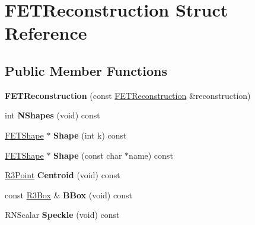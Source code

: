 \hypertarget{struct_f_e_t_reconstruction}{}\section{F\+E\+T\+Reconstruction Struct Reference}
\label{struct_f_e_t_reconstruction}
\subsection*{Public Member Functions}
\begin{DoxyCompactItemize}
\item 
{\bfseries F\+E\+T\+Reconstruction} (const \hyperlink{struct_f_e_t_reconstruction}{F\+E\+T\+Reconstruction} \&reconstruction)\hypertarget{struct_f_e_t_reconstruction_a7a38b2b91e590ef69766b621ffb56ffe}{}\label{struct_f_e_t_reconstruction_a7a38b2b91e590ef69766b621ffb56ffe}

\item 
int {\bfseries N\+Shapes} (void) const \hypertarget{struct_f_e_t_reconstruction_aa6a4ec3001aaee64cb7f915b79f75ab9}{}\label{struct_f_e_t_reconstruction_aa6a4ec3001aaee64cb7f915b79f75ab9}

\item 
\hyperlink{struct_f_e_t_shape}{F\+E\+T\+Shape} $\ast$ {\bfseries Shape} (int k) const \hypertarget{struct_f_e_t_reconstruction_a5623ece2b769927c2d5f8a7478a34ea3}{}\label{struct_f_e_t_reconstruction_a5623ece2b769927c2d5f8a7478a34ea3}

\item 
\hyperlink{struct_f_e_t_shape}{F\+E\+T\+Shape} $\ast$ {\bfseries Shape} (const char $\ast$name) const \hypertarget{struct_f_e_t_reconstruction_a55c0ae1d8f702f754be5d3a5e32632b3}{}\label{struct_f_e_t_reconstruction_a55c0ae1d8f702f754be5d3a5e32632b3}

\item 
\hyperlink{class_r3_point}{R3\+Point} {\bfseries Centroid} (void) const \hypertarget{struct_f_e_t_reconstruction_a485cfa0c46125406b065bdd5124d69f8}{}\label{struct_f_e_t_reconstruction_a485cfa0c46125406b065bdd5124d69f8}

\item 
const \hyperlink{class_r3_box}{R3\+Box} \& {\bfseries B\+Box} (void) const \hypertarget{struct_f_e_t_reconstruction_afe3df7eb8e98b70df9298354820d3b56}{}\label{struct_f_e_t_reconstruction_afe3df7eb8e98b70df9298354820d3b56}

\item 
R\+N\+Scalar {\bfseries Speckle} (void) const \hypertarget{struct_f_e_t_reconstruction_aca09d5f40ec4be8ffe25269ba07ab512}{}\label{struct_f_e_t_reconstruction_aca09d5f40ec4be8ffe25269ba07ab512}


\end{DoxyCompactItemize}
